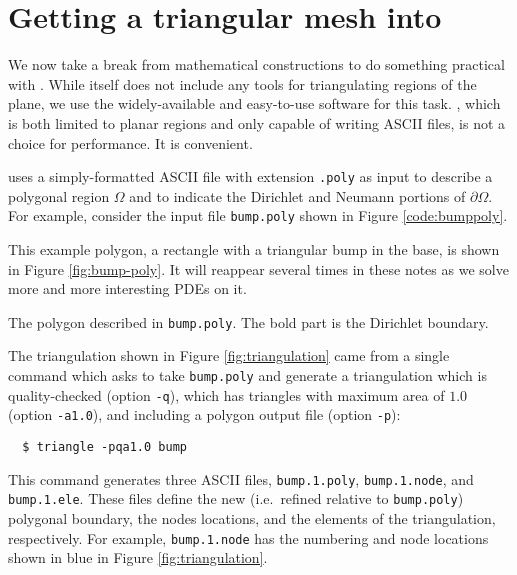 \section{Getting a triangular mesh into \PETSc}

We now take a break from mathematical constructions to do something practical with \PETSc.  While \PETSc itself does not include any tools for triangulating regions of the plane, we use the widely-available and easy-to-use \Triangle software \citep{Shewchuk1996} for this task.  \Triangle, which is both limited to planar regions and only capable of writing ASCII files, is not a choice for performance.  It is convenient.

\Triangle uses a simply-formatted ASCII file with extension \texttt{.poly} as input to describe a polygonal region $\Omega$ and to indicate the Dirichlet and Neumann portions of $\partial \Omega$.  For example, consider the input file \texttt{bump.poly} shown in Figure \ref{code:bumppoly}. 


This example polygon, a rectangle with a triangular bump in the base, is shown in Figure \ref{fig:bump-poly}.  It will reappear several times in these notes as we solve more and more interesting PDEs on it.

\begin{marginfigure}

\caption{The polygon described in \texttt{bump.poly}.  The bold part is the Dirichlet boundary.}
\label{fig:bump-poly}
\end{marginfigure}

The triangulation shown in Figure \ref{fig:triangulation} came from a single command which asks \Triangle to take \texttt{bump.poly} and generate a triangulation which is quality-checked \citep{Shewchuk1996} (option \texttt{-q}), which has triangles with maximum area of $1.0$ (option \texttt{-a1.0}), and including a polygon output file (option \texttt{-p}):
\begin{verbatim}
  $ triangle -pqa1.0 bump
\end{verbatim}
This command generates three ASCII files, \texttt{bump.1.poly}, \texttt{bump.1.node}, and  \texttt{bump.1.ele}.  These files define the new (i.e.~refined relative to \texttt{bump.poly}) polygonal boundary, the nodes locations, and the elements of the triangulation, respectively.  For example, \texttt{bump.1.node} has the numbering and node locations shown in blue in Figure \ref{fig:triangulation}.


